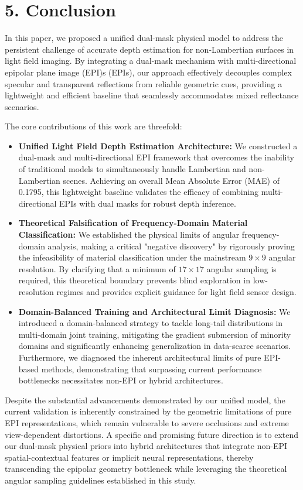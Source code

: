 \documentclass[lettersize,journal]{IEEEtran}
\begin{document}
\section{5. Conclusion}


In this paper, we proposed a unified dual-mask physical model to address the persistent challenge of accurate depth estimation for non-Lambertian surfaces in light field imaging. By integrating a dual-mask mechanism with multi-directional epipolar plane image (EPI)s (EPIs), our approach effectively decouples complex specular and transparent reflections from reliable geometric cues, providing a lightweight and efficient baseline that seamlessly accommodates mixed reflectance scenarios.

The core contributions of this work are threefold:
\begin{itemize}
  \item \textbf{Unified Light Field Depth Estimation Architecture:} We constructed a dual-mask and multi-directional EPI framework that overcomes the inability of traditional models to simultaneously handle Lambertian and non-Lambertian scenes. Achieving an overall Mean Absolute Error (MAE) of 0.1795, this lightweight baseline validates the efficacy of combining multi-directional EPIs with dual masks for robust depth inference.
  \item \textbf{Theoretical Falsification of Frequency-Domain Material Classification:} We established the physical limits of angular frequency-domain analysis, making a critical "negative discovery" by rigorously proving the infeasibility of material classification under the mainstream $9 \times 9$ angular resolution. By clarifying that a minimum of $17 \times 17$ angular sampling is required, this theoretical boundary prevents blind exploration in low-resolution regimes and provides explicit guidance for light field sensor design.
  \item \textbf{Domain-Balanced Training and Architectural Limit Diagnosis:} We introduced a domain-balanced strategy to tackle long-tail distributions in multi-domain joint training, mitigating the gradient submersion of minority domains and significantly enhancing generalization in data-scarce scenarios. Furthermore, we diagnosed the inherent architectural limits of pure EPI-based methods, demonstrating that surpassing current performance bottlenecks necessitates non-EPI or hybrid architectures.
\end{itemize}
Despite the substantial advancements demonstrated by our unified model, the current validation is inherently constrained by the geometric limitations of pure EPI representations, which remain vulnerable to severe occlusions and extreme view-dependent distortions. A specific and promising future direction is to extend our dual-mask physical priors into hybrid architectures that integrate non-EPI spatial-contextual features or implicit neural representations, thereby transcending the epipolar geometry bottleneck while leveraging the theoretical angular sampling guidelines established in this study.
\end{document}
